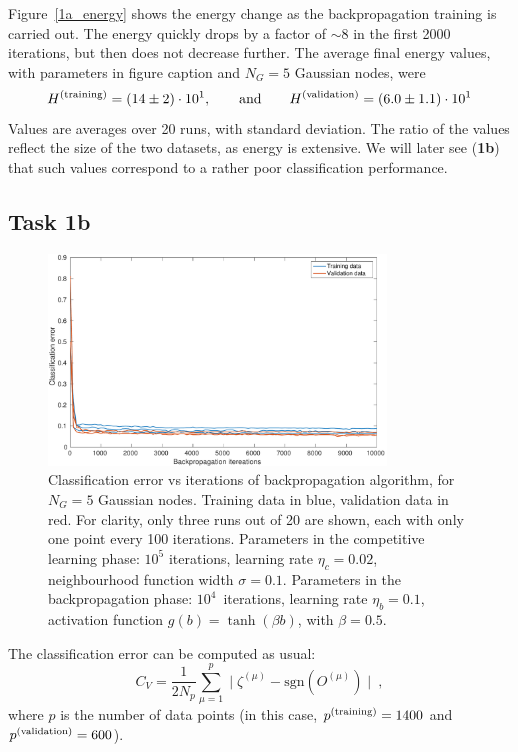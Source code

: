 \documentclass[12pt,titlepage]{article}
\begin{document}
Figure~\ref{1a_energy} shows the energy change as the backpropagation training is carried out. The energy quickly drops by a factor of $\sim8$ in the first 2000 iterations, but then does not decrease further. The average final energy values, with parameters in figure caption and $N_G = 5$ Gaussian nodes, were
\[
H^{(\textup{training})} = (14 \pm 2)\cdot 10^1, \qquad \mbox{and} \qquad H^{(\textup{validation})} = (6.0 \pm 1.1)\cdot 10^1
\]
Values are averages over 20 runs, with standard deviation. The ratio of the values reflect the size of the two datasets, as energy is extensive. We will later see (\textbf{1b}) that such values correspond to a rather poor classification performance.

\clearpage
\subsection*{Task 1b}

\begin{figure}[htbp]
\centering
\includegraphics[width=0.8\textwidth]{1b_error.pdf}
\caption{Classification error vs iterations of backpropagation algorithm, for $N_G = 5$ Gaussian nodes. Training data in blue, validation data in red. For clarity, only three runs out of 20 are shown, each with only one point every 100 iterations. Parameters in the competitive learning phase: $10^5$ iterations, learning rate $\eta_c = 0.02$, neighbourhood function width $\sigma = 0.1$. Parameters in the backpropagation phase: $10^4$~iterations, learning rate $\eta_b = 0.1$, activation function $g(b) = \tanh(\beta b)$, with $\beta = 0.5$.}
\label{1b_error}
\end{figure}

The classification error can be computed as usual:
\[
C_V = \dfrac{1}{2 N_p} \sum_{\mu = 1}^{p} \mid \zeta^{(\mu)}-\mbox{sgn}(O^{(\mu)})\mid \ ,
\]
where $p$ is the number of data points (in this case, $p^{(\textup{training})} = 1400$ and $p^{(\textup{validation})} = 600$).
\end{document}
